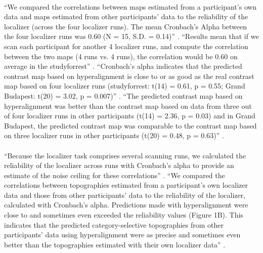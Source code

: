 \paragraph{\citet{jiahui2020predicting}}
%
``We compared the correlations between maps estimated from a participant's own
data and maps estimated from other participants' data to the reliability of the
localizer (across the four localizer runs).
%
The mean Cronbach's Alpha between the four localizer runs was 0.60 (N = 15, S.D.
= 0.14)'' \citep{jiahui2020predicting}.
%
``Results mean that if we scan each participant for another 4 localizer
runs, and compute the correlation between the two maps (4 runs vs. 4 runs), the
correlation would be 0.60 on average in the studyforrest''
\citep{jiahui2020predicting}.
%
``Cronbach's alpha indicates that the predicted contrast map based on
hyperalignment is close to or as good as the real contrast map based on four
localizer runs (studyforrest: t(14) = 0.61, p = 0.55; Grand Budapest: t(20) =
3.02, p = 0.007)'' \citep{jiahui2020predicting}.
%
``The predicted contrast map based on hyperalignment was better than the
contrast map based on data from three out of four localizer runs in other
participants (t(14) = 2.36, p = 0.03) and in Grand Budapest, the predicted
contrast map was comparable to the contrast map based on three localizer runs in
other participants (t(20) = 0.48, p = 0.63)''
\citep{jiahui2020predicting}.


\paragraph{\citet{jiahui2022cross}}
%
``Because the localizer task comprises several scanning runs, we calculated the
reliability of the localizer across runs with Cronbach's alpha to provide an
estimate of the noise ceiling for these correlations'' \citep{jiahui2022cross}.
%
``We compared the correlations between topographies estimated from a
participant's own localizer data and those from other participants' data to the
reliability of the localizer, calculated with Cronbach's alpha.
%
Predictions made with hyperalignment were close to and sometimes even exceeded
the reliability values (Figure 1B).
%
This indicates that the predicted category-selective topographies from other
participants' data using hyperalignment were as precise and sometimes even
better than the topographies estimated with their own localizer data''
\citep{jiahui2022cross}.


